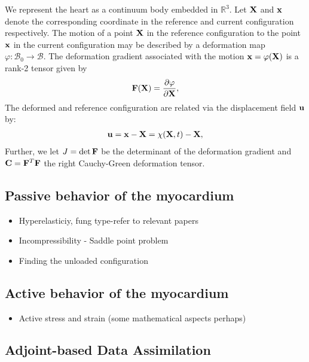 We represent the heart as a continuum body  embedded in
$\mathbb{R}^3$. Let $\mathbf{X}$ and  $\mathbf{x}$ denote the corresponding
coordinate in the reference and current configuration respectively.
The motion of a point $\mathbf{X}$ in the reference configuration to the
point $\mathbf{x}$ in the current configuration  may be described by a
deformation map  $\varphi :  \mathcal{B}_0  \rightarrow \mathcal{B}$.
The deformation gradient associated with the motion $\mathbf{x} =
\varphi(\mathbf{X})$ is a rank-2 tensor given by  
\begin{align}
\mathbf{F}(\mathbf{X}) = \frac{\partial \varphi}{\partial \mathbf{X}}, 
\end{align}
The deformed and reference configuration are related via the
displacement field $\mathbf{u}$ by: 
\begin{align}  
\mathbf{u} = \mathbf{x}-\mathbf{X} = \chi( \mathbf{X}, t) -\mathbf{X},
\end{align} 
Further, we let $J = \det \mathbf{F}$ be the determinant of the deformation gradient 
and $\mathbf{C} = \mathbf{F}^T\mathbf{F}$ the right Cauchy-Green deformation tensor.\cite{holzapfel2000nonlinear}


\subsection{Passive behavior of the myocardium}

\begin{itemize}
  \item Hyperelasticiy, fung type-refer to relevant papers
  \item Incompressibility - Saddle point problem
  \item Finding the unloaded configuration
\end{itemize}



\subsection{Active behavior of the myocardium}


\begin{itemize}
  \item Active stress and strain (some mathematical aspects perhaps)
\end{itemize}




\subsection{Adjoint-based Data Assimilation}

